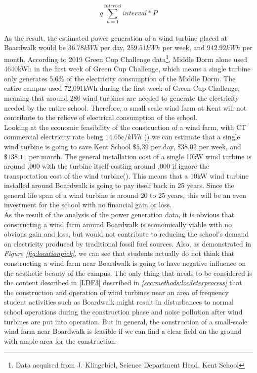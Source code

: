 \documentclass[review]{elsarticle}
\begin{document}
\begin{equation}q
    \label{equ:windenergy}
    \sum_{n=1}^{interval} interval*P
\end{equation}
\\\indent As the result, the estimated power generation of a wind turbine placed at Boardwalk would be $36.78kWh$ per day, $259.51kWh$ per week, 
and $942.92kWh$ per month. According to 2019 Green Cup Challenge data\footnote{Data acquired from J. Klingebiel, Science Department Head, Kent School}, 
Middle Dorm alone used 4640kWh in the first week of Green Cup Challenge, which means a single turbine only generates 5.6\% of the electricity 
consumption of the Middle Dorm. The entire campus used 72,091kWh during the first week of Green Cup Challenge, meaning that around 280 wind turbines 
are needed to generate the electricity needed by the entire school. Therefore, a small scale wind farm at Kent will not contribute to the relieve of electrical 
consumption of the school. 
\\\indent Looking at the economic feasibility of the construction of a wind farm, with CT commercial electricity rate being $14.65\cent/kWh$
(\cite{u.s._energy_information_administration_2019}) we can estimate that a single wind turbine is going to save Kent School $\mathdollar5.39$ per day, 
$\mathdollar38.02$ per week, and $\mathdollar138.11$ per month. The general installation cost of a single 10kW wind turbine is around ,000 
with the turbine itself costing around ,000 if ignore the transportation cost of the wind turbine(\cite{bergey_wind_power}). This means 
that a 10kW wind turbine installed around Boardwalk is going to pay itself back in 25 years. Since the general life span of a wind turbine is around 
20 to 25 years, this will be an even investment for the school with no financial gain or loss.
\\\indent As the result of the analysis of the power generation data, it is obvious that constructing a wind farm around Boardwalk is economically viable 
with no obvious gain and loss, but would not contribute to reducing the school's demand on electricity produced by traditional fossil fuel sources. Also, 
as demonstrated in \textit{Figure \ref{fig:locationpick}}, we can see that students actually do not think that constructing a wind farm near Boardwalk is 
going to have negative influence on the aesthetic beauty of the campus. The only thing that needs to be considered is the content described in \ref{LDF3} 
described in \textit{\ref{sec:methods:locdeterprocess}} that the construction and operation of wind turbines near an area of frequency 
student activities such as Boardwalk might result in disturbances to normal school operations during the construction phase and noise pollution after wind 
turbines are put into operation. But in general, the construction of a small-scale wind farm near Boardwalk is feasible if we can find a clear field on the 
ground with ample area for the construction.
\end{document}
